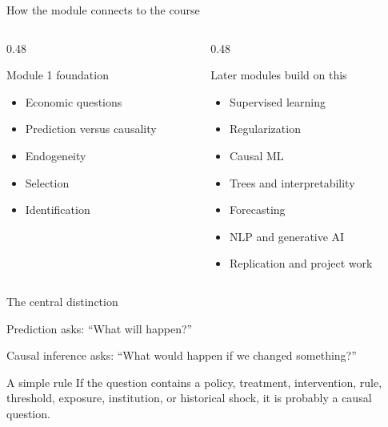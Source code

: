 \documentclass[aspectratio=169,11pt]{beamer}
\begin{document}
\begin{frame}{How the module connects to the course}
\begin{columns}
\begin{column}{0.48\textwidth}
\begin{block}{Module 1 foundation}
\begin{itemize}
  \item Economic questions
  \item Prediction versus causality
  \item Endogeneity
  \item Selection
  \item Identification
\end{itemize}
\end{block}
\end{column}
\begin{column}{0.48\textwidth}
\begin{alertblock}{Later modules build on this}
\begin{itemize}
  \item Supervised learning
  \item Regularization
  \item Causal ML
  \item Trees and interpretability
  \item Forecasting
  \item NLP and generative AI
  \item Replication and project work
\end{itemize}
\end{alertblock}
\end{column}
\end{columns}
\end{frame}

\begin{frame}{The central distinction}
\begin{center}
\Large
Prediction asks: \quad ``What will happen?''

\vspace{1em}

Causal inference asks: \quad ``What would happen if we changed something?''
\end{center}

\vspace{1em}
\begin{block}{A simple rule}
If the question contains a policy, treatment, intervention, rule, threshold, exposure, institution, or historical shock, it is probably a causal question.
\end{block}
\end{frame}
\end{document}
